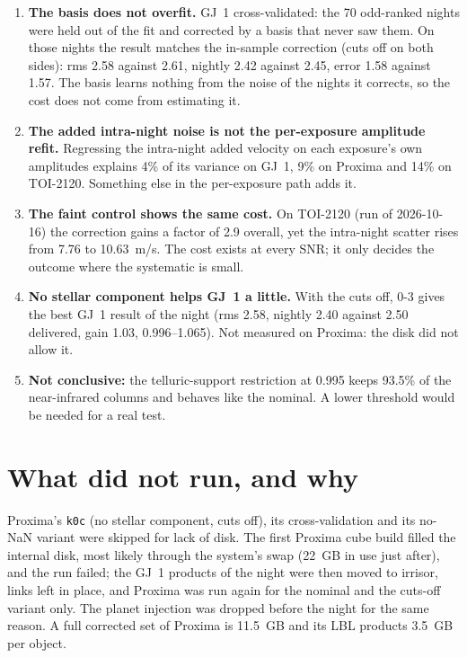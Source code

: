 \begin{enumerate}
\item \textbf{The basis does not overfit.} GJ~1 cross-validated: the 70
  odd-ranked nights were held out of the fit and corrected by a basis that
  never saw them. On those nights the result matches the in-sample correction
  (cuts off on both sides): rms 2.58 against 2.61, nightly 2.42 against 2.45,
  error 1.58 against 1.57. The basis learns nothing from the noise of the
  nights it corrects, so the cost does not come from estimating it.

\item \textbf{The added intra-night noise is not the per-exposure amplitude
  refit.} Regressing the intra-night added velocity on each exposure's own
  amplitudes explains 4\% of its variance on GJ~1, 9\% on Proxima and 14\% on
  TOI-2120. Something else in the per-exposure path adds it.

\item \textbf{The faint control shows the same cost.} On TOI-2120 (run of
  2026-10-16) the correction gains a factor of 2.9 overall, yet the
  intra-night scatter rises from 7.76 to 10.63~m/s. The cost exists at every
  SNR; it only decides the outcome where the systematic is small.

\item \textbf{No stellar component helps GJ~1 a little.} With the cuts off,
  0-3 gives the best GJ~1 result of the night (rms 2.58, nightly 2.40 against
  2.50 delivered, gain 1.03, 0.996--1.065). Not measured on Proxima: the disk
  did not allow it.

\item \textbf{Not conclusive:} the telluric-support restriction at 0.995 keeps
  93.5\% of the near-infrared columns and behaves like the nominal. A lower
  threshold would be needed for a real test.
\end{enumerate}

\section*{What did not run, and why}

Proxima's \texttt{k0c} (no stellar component, cuts off), its cross-validation
and its no-NaN variant were skipped for lack of disk. The first Proxima cube
build filled the internal disk, most likely through the system's swap (22~GB
in use just after), and the run failed; the GJ~1 products of the night were then moved to irrisor,
links left in place, and Proxima was run again for the nominal and the
cuts-off variant only. The planet injection was dropped before the night for
the same reason. A full corrected set of Proxima is 11.5~GB and its LBL
products 3.5~GB per object.

